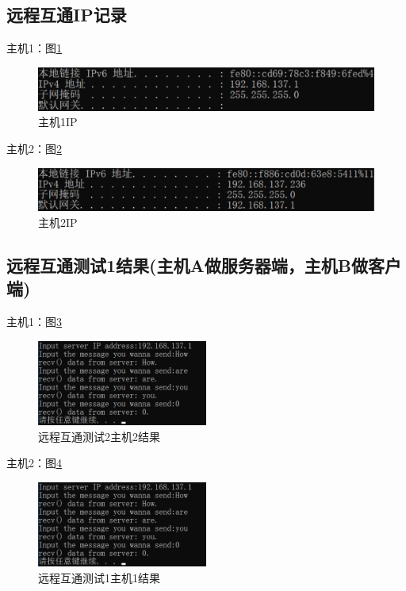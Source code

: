 \documentclass[a4paper]{ctexrep}
\begin{document}
\begin{spacing}{1.5}
\newpage
\subsection{远程互通IP记录}
主机1：图\ref{IP1}
\begin{figure}[htbp]
	\centering
	\includegraphics [width=1\textwidth]{figure//IP1.png}
	\caption{主机1IP}\label{IP1}
\end{figure}

主机2：图\ref{IP2}
\begin{figure}[htbp]
	\centering
	\includegraphics [width=1\textwidth]{figure//IP2.png}
	\caption{主机2IP}\label{IP2}
\end{figure}

\subsection{远程互通测试1结果(主机A做服务器端，主机B做客户端)}
主机1：图\ref{remote1local1}
\begin{figure}[htbp]
	\centering
	\includegraphics [width=0.5\textwidth]{figure//remote1local2.png}
	\caption{远程互通测试2主机2结果}\label{remote1local1}
\end{figure}

\newpage
主机2：图\ref{remote1local2}
\begin{figure}[htbp]
	\centering
	\includegraphics [width=0.5\textwidth]{figure//remote1local2.png}
	\caption{远程互通测试1主机1结果}\label{remote1local2}
\end{figure}


\end{spacing}
\end{document}
